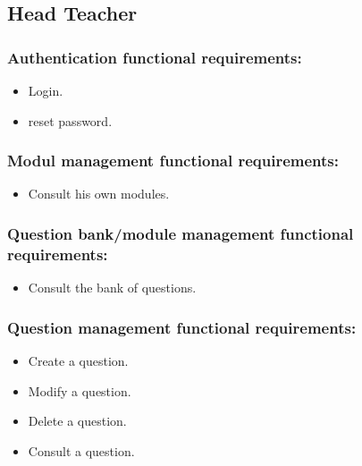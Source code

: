 \documentclass[a4paper,12p]{article}
\begin{document}
    \subsection{Head Teacher}
     \begin{itemize}
        \subsubsection{Authentication functional requirements:}
        \begin{itemize}
            \item Login.
            \item reset password.
        \end{itemize}

        \subsubsection{Modul management functional requirements:}
        \begin{itemize}
            \item Consult his own modules.
        \end{itemize}

        \subsubsection{Question bank/module management functional requirements:}
        \begin{itemize}
            \item Consult the bank of questions.
        \end{itemize}

        \subsubsection{Question management functional requirements:}
        \begin{itemize}
            \item Create a question.
            \item Modify a question.
            \item Delete a question.
            \item Consult a question.
        \end{itemize}


\end{itemize}
\end{document}

